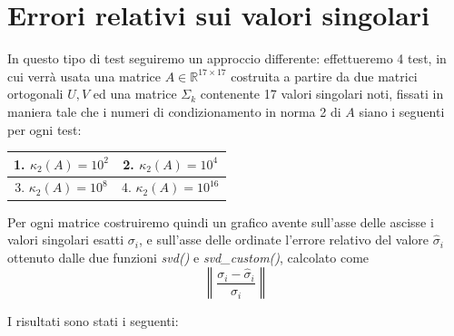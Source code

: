 \newpage
\section{Errori relativi sui valori singolari}
In questo tipo di test seguiremo un approccio differente: effettueremo 4 test, 
in cui verrà usata una matrice $A \in \mathbb{R}^{17 \times 17}$ costruita a 
partire da due matrici ortogonali $U, V$ ed una matrice $\Sigma_k$ contenente 17 
valori singolari noti, fissati in maniera tale che i numeri di condizionamento 
in norma 2 di $A$ siano i seguenti per ogni test:

\begin{center}
\begin{tabular}{|c|c|}
    \hline
    1. $\kappa_2(A) = 10^2$ & 2. $\kappa_2(A) = 10^4$ \\
    \hline
    3. $\kappa_2(A) = 10^8$ & 4. $\kappa_2(A) = 10^{16}$ \\
    \hline
\end{tabular}
\end{center}

Per ogni matrice costruiremo quindi un grafico avente sull'asse delle ascisse i 
valori singolari esatti $\sigma_i$, e sull'asse delle ordinate l'errore relativo 
del valore $\hat{\sigma}_i$ ottenuto dalle due funzioni \textit{svd()} e 
\textit{svd\_custom()}, calcolato come
\begin{equation*}
	\left\| \frac{\sigma_i - \hat{\sigma}_i}{\sigma_i} \right\|
\end{equation*}

I risultati sono stati i seguenti:

